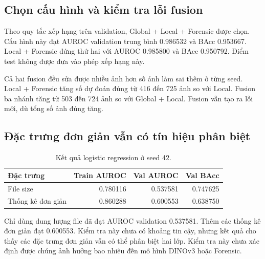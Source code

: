 \begin{table}[H]
\centering
\caption{Macro BAcc trung bình qua ba seed. Mỗi cấu hình giữ ngưỡng chọn trên validation sạch.}
\label{tab:robustness-bacc}

\end{table}

\subsection{Chọn cấu hình và kiểm tra lỗi fusion}
Theo quy tắc xếp hạng trên validation, Global + Local + Forensic được chọn. Cấu hình này đạt AUROC validation trung bình 0.986532 và BAcc 0.953667. Local + Forensic đứng thứ hai với AUROC 0.985800 và BAcc 0.950792. Điểm test không được đưa vào phép xếp hạng này.

\begin{table}[H]
\centering
\caption{Số ảnh fusion sửa đúng và làm sai thêm trên 8.000 ảnh test sạch. Mỗi cấu hình dùng ngưỡng validation riêng.}
\label{tab:rescue-harm}

\end{table}

Cả hai fusion đều sửa được nhiều ảnh hơn số ảnh làm sai thêm ở từng seed. Local + Forensic tăng số dự đoán đúng từ 416 đến 725 ảnh so với Local. Fusion ba nhánh tăng từ 503 đến 724 ảnh so với Global + Local. Fusion vẫn tạo ra lỗi mới, dù tổng số ảnh đúng tăng.

\subsection{Đặc trưng đơn giản vẫn có tín hiệu phân biệt}
\begin{table}[H]
\centering
\caption{Kết quả logistic regression ở seed 42.}
\label{tab:shortcut}
\begin{tabular}{lrrr}
\toprule
Đặc trưng & Train AUROC & Val AUROC & Val BAcc \\
\midrule
File size & 0.780116 & 0.537581 & 0.747625 \\
Thống kê đơn giản & 0.860288 & 0.600553 & 0.638750 \\
\bottomrule
\end{tabular}
\end{table}

Chỉ dùng dung lượng file đã đạt AUROC validation 0.537581. Thêm các thống kê đơn giản đạt 0.600553. Kiểm tra này chưa có khoảng tin cậy, nhưng kết quả cho thấy các đặc trưng đơn giản vẫn có thể phân biệt hai lớp. Kiểm tra này chưa xác định được chúng ảnh hưởng bao nhiêu đến mô hình DINOv3 hoặc Forensic.

